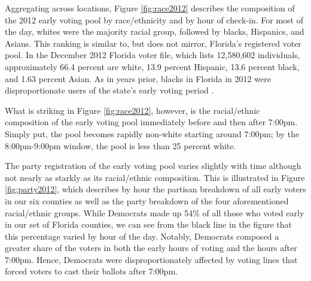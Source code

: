\documentclass[12pt,titlepage]{article}
\begin{document}
Aggregating across locations, Figure \ref{fig:race2012} describes the
composition of the 2012 early voting pool by race/ethnicity and by
hour of check-in.  For most of the day, whites were the majority
racial group, followed by blacks, Hispanics, and Asians.  This ranking
is similar to, but does not mirror, Florida's registered voter pool.
In the December 2012 Florida voter file, which lists 12,580,602
individuals, approximately 66.4 percent are white, 13.9 percent
Hispanic, 13.6 percent black, and 1.63 percent Asian.  As in years
prior, blacks in Florida in 2012 were disproportionate users of the
state's early voting period \citep{herronsmith:souls}.





What is striking in Figure \ref{fig:race2012}, however, is the
racial/ethnic composition of the early voting pool immediately before
and then after 7:00pm.  Simply put, the pool becomes rapidly non-white
starting around 7:00pm; by the 8:00pm-9:00pm window, the pool is less
than 25 percent white.


The party registration of the early voting pool varies slightly with
time although not nearly as starkly as its racial/ethnic composition.
This is illustrated in Figure \ref{fig:party2012}, which describes by
hour the partisan breakdown of all early voters in our six counties as
well as the party breakdown of the four aforementioned racial/ethnic
groups.  While Democrats made up 54\% of all those who voted early in
our set of Florida counties, we can see from the black line in the
figure that this percentage varied by hour of the day.  Notably,
Democrats composed a greater share of the voters in both the early
hours of voting and the hours after 7:00pm.  Hence, Democrats were
disproportionately affected by voting lines that forced voters to cast
their ballots after 7:00pm.
\end{document}
